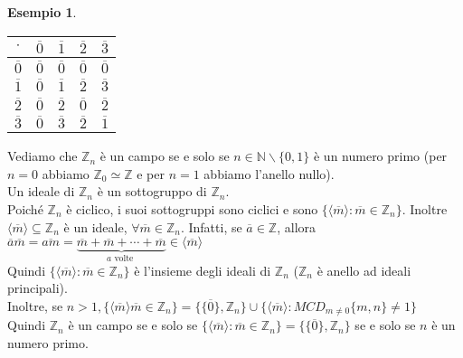 \documentclass[a4paper,12pt]{article}
\theoremstyle{def}
\theoremstyle{prop}
\theoremstyle{esempio}
\newtheorem*{example}{Esempio}
\theoremstyle{dimostrazione}
\theoremstyle{teo}
\theoremstyle{osservazione}
\begin{document}
\begin{example}
\begin{itemize}
\begin{table}[htbp]
\begin{tabular}{ c | c | c | c | c}
				      \(\cdot\)        & \(\overline{0}\) & \(\overline{1}\) & \(\overline{2}\) & \(\overline{3}\) \\ \hline
				      \(\overline{0}\) & \(\overline{0}\) & \(\overline{0}\) & \(\overline{0}\) & \(\overline{0}\) \\ \hline
				      \(\overline{1}\) & \(\overline{0}\) & \(\overline{1}\) & \(\overline{2}\) & \(\overline{3}\) \\ \hline
				      \(\overline{2}\) & \(\overline{0}\) & \(\overline{2}\) & \(\overline{0}\) & \(\overline{2}\) \\ \hline
				      \(\overline{3}\) & \(\overline{0}\) & \(\overline{3}\) & \(\overline{2}\) & \(\overline{1}\) \\
			      \end{tabular}
		      \end{table}
	\end{itemize}
\end{example}

Vediamo che \(\mathbb{Z}_n\) è un campo se e solo se \(n \in \mathbb{N} \backslash \{0,1\}\)
è un numero primo (per \(n =0 \) abbiamo \(\mathbb{Z}_0 \simeq \mathbb{Z} \) e per \(n = 1\) abbiamo l'anello nullo).\\
Un ideale di \(\mathbb{Z}_n \) è un sottogruppo di \(\mathbb{Z}_n\).\\
Poiché \(\mathbb{Z}_n\) è ciclico, i suoi sottogruppi sono ciclici e sono \(\{\langle \overline{m} \rangle :
\overline{m} \in \mathbb{Z}_n\}\). Inoltre \(\langle \overline{m} \rangle \subseteq \mathbb{Z}_n\) è un ideale,
\(\forall \overline{m} \in \mathbb{Z}_n\). Infatti, se \(\overline{a} \in \mathbb{Z} \), allora \(
\overline{a} \overline{m} = \overline{am} = \underbrace{\overline{m} + \overline{m} + \cdots + \overline{m}}_{a \text{ volte }}  \in
\langle \overline{m} \rangle\)\\
Quindi \(\{\langle \overline{m} \rangle : \overline{m} \in \mathbb{Z}_n\}\) è l'insieme
degli ideali di \(\mathbb{Z}_n\) (\(\mathbb{Z}_n\) è anello ad ideali principali).\\
Inoltre, se \(n > 1, \{\langle \overline{m} \rangle \overline{m} \in \mathbb{Z}_n\} =
\{\{\overline{0}\}, \mathbb{Z}_n\} \cup \{\langle \overline{m} \rangle : MCD_{m \neq 0} \{m,n\} \neq 1\}\)\\
Quindi \(\mathbb{Z}_n\) è un campo se e solo se \(\{\langle \overline{m} \rangle : \overline{m} \in \mathbb{Z}_n\} =
\{\{\overline{0}\}, \mathbb{Z}_n\}\) se e solo se \(n\) è un numero primo.
\end{document}
